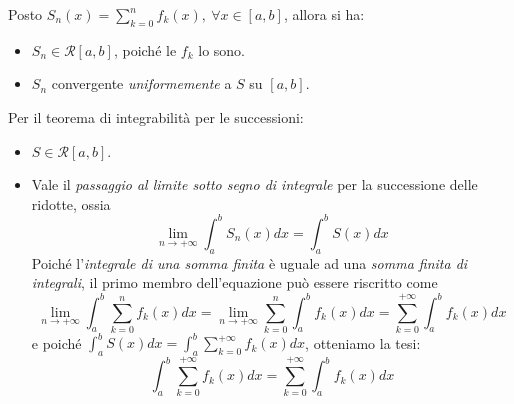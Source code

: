 \begin{demonstration}
	Posto $\displaystyle S_n\left(x\right)=\sum_{k=0}^{n}f_k\left(x\right),\ \forall x\in \left[a,b\right]$, allora si ha:
	\begin{itemize}
		\item $S_n\in\mathcal{R}\left[a,b\right]$, poiché le $f_k$ lo sono.
		\item $S_n$ convergente \textit{uniformemente} a $S$ su $\left[a,b\right]$.
	\end{itemize}
	Per il teorema di integrabilità per le successioni:
	\begin{itemize}
		\item $S\in\mathcal{R}\left[a,b\right]$.
		\item Vale il \textit{passaggio al limite sotto segno di integrale} per la successione delle ridotte, ossia
		\begin{equation*}
			\lim_{n\to+\infty}\int_{a}^{b}S_n\left(x\right)dx=\int_{a}^{b}S\left(x\right)dx
		\end{equation*}
		Poiché l'\textit{integrale di una somma finita} è uguale ad una \textit{somma finita di integrali}, il primo membro dell'equazione può essere riscritto come
		\begin{equation*}
			\lim_{n\to+\infty}\int_{a}^{b}\sum_{k=0}^{n}f_k\left(x\right)dx=\lim_{n\to+\infty}\sum_{k=0}^{n}\int_{a}^{b}f_k\left(x\right)dx=\sum_{k=0}^{+\infty}\int_{a}^{b}f_k\left(x\right)dx
		\end{equation*}
		e poiché $\displaystyle \int_{a}^{b}S\left(x\right)dx=\int_{a}^{b}\sum_{k=0}^{+\infty}f_k\left(x\right)dx$, otteniamo la tesi:
		\begin{equation*}
			\int_{a}^{b}\sum_{k=0}^{+\infty}f_k\left(x\right)dx=\sum_{k=0}^{+\infty}\int_{a}^{b}f_k\left(x\right)dx
		\end{equation*}
	\end{itemize}
\end{demonstration}